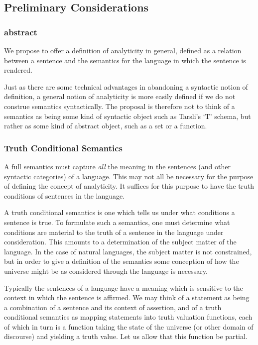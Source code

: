 \documentclass{rbjk}
\begin{document}
\begin{article}
\subsection{Preliminary Considerations}

\subsubsection{abstract}

We propose to offer a definition of analyticity in general, defined as a relation between a sentence and the semantics for the language in which the sentence is rendered.

Just as there are some technical advantages in abandoning a syntactic notion of definition, a general notion of analyticity is more easily defined if we do not construe semantics syntactically.
The proposal is therefore not to think of a semantics as being some kind of syntactic object such as Tarsli's `T' schema, but rather as some kind of abstract object, such as a set or a function.

\subsubsection{Truth Conditional Semantics}

A full semantics must capture {\it all} the meaning in the sentences (and other syntactic categories) of a language.
This may not all be necessary for the purpose of defining the concept of analyticity.
It suffices for this purpose to have the truth conditions of sentences in the language.

A truth conditional semantics is one which tells us under what conditions a sentence is true.
To formulate such a semantics, one must determine what conditions are material to the truth of a sentence in the language under consideration.
This amounts to a determination of the subject matter of the language.
In the case of natural languages, the subject matter is not constrained, but in order to give a definition of the semantics some conception of how the universe might be as considered through the language is necessary.

Typically the sentences of a language have a meaning which is sensitive to the context in which the sentence is affirmed.
We may think of a statement as being a combination of a sentence and its context of assertion, and of a truth conditional semantics as mapping statements into truth valuation functions, each of which in turn is a function taking the state of the universe (or other domain of discourse) and yielding a truth value.
Let us allow that this function be partial.


\end{article}
\end{document}
